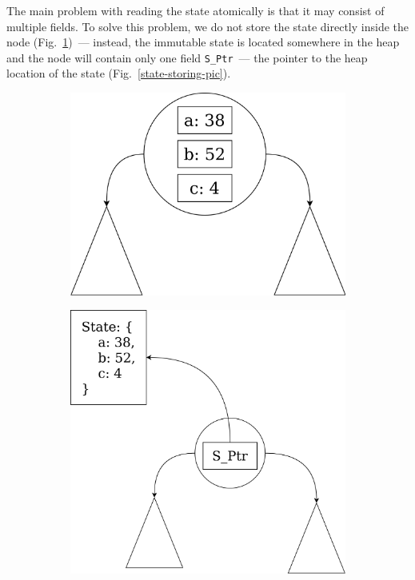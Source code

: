 \documentclass[times, dvipsnames,%
               languages={russian,english} %
              ]{itmo-student-thesis}
\begin{document}
The main problem with reading the state atomically is that it may consist of multiple fields. To solve this problem, we do not store the state directly inside the node (Fig.~\ref{state-storing-inside-pic})~--- instead, the immutable state is located somewhere in the heap and the node will contain only one field \texttt{S\_Ptr}~--- the pointer to the heap location of the state (Fig.~\ref{state-storing-pic}).

\begin{figure}[H]
     \centering
     \begin{subfigure}[b]{0.45\linewidth}
          \centering
          \includegraphics[width=\linewidth]{pics/state-storing-inside.png}
          \label{state-storing-inside-pic}
     \end{subfigure}
     \hfill
     \begin{subfigure}[b]{0.45\linewidth}
          \centering
          \includegraphics[width=\linewidth]{pics/state-storing.png}

\end{subfigure}
\end{figure}
\end{document}
